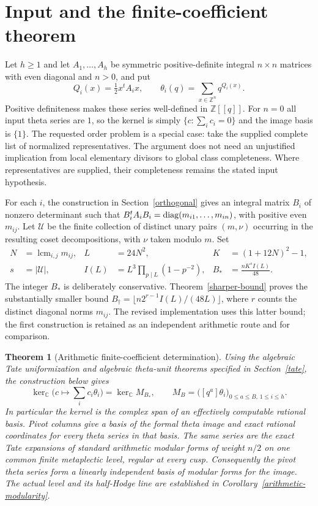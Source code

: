 \documentclass[11pt]{article}
\newtheorem{theorem}{Theorem}[section]
\theoremstyle{remark}\newtheorem{remark}[theorem]{Remark}
\newcommand{\Z}{\mathbb Z}\newcommand{\Q}{\mathbb Q}
\newcommand{\C}{\mathbb C}\newcommand{\OO}{\mathcal O}
\DeclareMathOperator{\lcm}{lcm}
\begin{document}
\section{Input and the finite-coefficient theorem}\label{input}
Let $h\geq1$ and let $A_1,\ldots,A_h$ be symmetric positive-definite integral $n\times n$
matrices with even diagonal and $n>0$, and put
\[
 Q_i(x)=\tfrac12x^tA_ix,\qquad
 \theta_i(q)=\sum_{x\in\Z^n}q^{Q_i(x)}.
\]
Positive definiteness makes these series well-defined in $\Z[[q]]$.
For $n=0$ all input theta series are $1$, so the kernel is simply
$\{c:\sum_i c_i=0\}$ and the image basis is $\{1\}$.
The requested order problem is a special case: take the supplied complete
list of normalized representatives. The argument does not need an
unjustified implication from local elementary divisors to global class
completeness. Where representatives are supplied, their completeness remains
the stated input hypothesis.

For each $i$, the construction in Section~\ref{orthogonal} gives an integral
matrix $B_i$ of nonzero determinant such that
$B_i^tA_iB_i=\operatorname{diag}(m_{i1},\ldots,m_{in})$, with positive even $m_{ij}$.
Let $\mathcal U$ be the finite collection of distinct unary pairs $(m,\nu)$
occurring in the resulting coset decompositions, with $\nu$ taken modulo $m$.
Set
\begin{align*}
 N&=\lcm_{i,j}m_{ij},& L&=24N^2,& K&=(1+12N)^2-1,\\
 s&=|\mathcal U|,& I(L)&=L^3\prod_{p\mid L}(1-p^{-2}),&
 B_*&=\frac{nK^s I(L)}{48}.
\end{align*}
The integer $B_*$ is deliberately conservative.
Theorem~\ref{sharper-bound} proves the substantially smaller bound
$B_\dagger=\lfloor n2^{r-1}I(L)/(48L)\rfloor$, where $r$ counts
the distinct diagonal norms $m_{ij}$. The revised implementation uses
this latter bound; the first construction is retained as an independent
arithmetic route and for comparison.

\begin{theorem}[Arithmetic finite-coefficient determination]\label{main}
Using the algebraic Tate uniformization and algebraic theta-unit theorems
specified in Section~\ref{tate}, the construction below gives
\[
 \ker_{\C}\bigl(c\longmapsto\textstyle\sum_i c_i\theta_i\bigr)
 =\ker_{\C} M_{B_*},\qquad
 M_B=\bigl([q^a]\theta_i\bigr)_{0\leq a\leq B,\,1\leq i\leq h}.
\]
In particular the kernel is the complex span of an effectively computable
rational basis. Pivot columns give a basis of the formal theta image and
exact rational coordinates for every theta series in that basis.
The same series are the exact Tate expansions of standard arithmetic
modular forms of weight $n/2$ on one common finite metaplectic level,
regular at every cusp. Consequently the pivot theta series form a
linearly independent basis of modular forms for the image. The actual
level and its half-Hodge line are established in
Corollary~\ref{arithmetic-modularity}.
\end{theorem}
\end{document}
